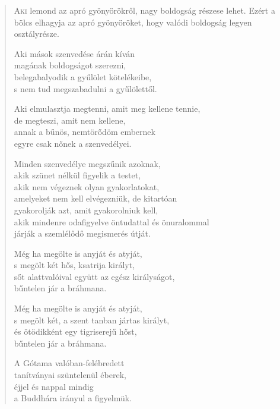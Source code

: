 
\begin{verse}

{\par%
\lettrine{A}{ki} {\LettrineTextFont lemond az apró gyönyörökről,}\newline
nagy boldogság részese lehet. Ezért a bölcs\newline
elhagyja az apró gyönyöröket,\verselinebreak
hogy valódi boldogság legyen osztályrésze.
\par}

 Aki mások szenvedése árán kíván\\
magának boldogságot szerezni,\\
belegabalyodik a gyűlölet kötelékeibe,\\
s nem tud megszabadulni a gyűlölettől.

 Aki elmulasztja megtenni, amit meg kellene tennie,\\
de megteszi, amit nem kellene,\\
annak a bűnös, nemtörődöm embernek\\
egyre csak nőnek a szenvedélyei.

 Minden szenvedélye megszűnik azoknak,\\
akik szünet nélkül figyelik a testet,\\
akik nem végeznek olyan gyakorlatokat,\\
amelyeket nem kell elvégezniük, de kitartóan\\
gyakorolják azt, amit gyakorolniuk kell,\\
akik mindenre odafigyelve öntudattal és önuralommal\\
járják a szemlélődő megismerés útját.

 Még ha megölte is anyját és atyját,\\
s megölt két hős, ksatrija királyt,\\
sőt alattvalóival együtt az egész királyságot,\\
bűntelen jár a bráhmana.

 Még ha megölte is anyját és atyját,\\
s megölt két, a szent tanban jártas királyt,\\
és ötödikként egy tigriserejű hőst,\\
bűntelen jár a bráhmana.

 A Gótama valóban-felébredett\\
tanítványai szüntelenül éberek,\\
éjjel és nappal mindig\\
a Buddhára irányul a figyelmük.


\end{verse}
